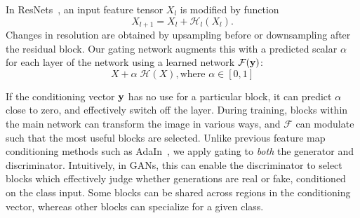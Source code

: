 
In ResNets~\cite{he2016deep}, an input feature tensor $X_l$ is modified by function
\begin{equation}
X_{l+1} = X_l+\mathcal{H}_l(X_l).
\end{equation}
Changes in resolution are obtained by upsampling before or downsampling after the residual block.
Our gating network augments this with a predicted scalar $\alpha$ for each layer of the network using a learned network $\mathcal{F}({\bf y})$:
\begin{equation}
X + \alpha \; \mathcal{H}(X), \text{where } \alpha \in [0,1]
\end{equation}

If the conditioning vector ${\bf y}$ has no use for a particular block, it can predict $\alpha$ close to zero, and effectively switch off the layer.
During training, blocks within the main network can transform the image in various ways, and $\mathcal{F}$ can modulate such that the most useful blocks are selected. 
Unlike previous feature map conditioning methods such as AdaIn~\cite{ulyanovinstance}, we apply gating to \emph{both} the generator and discriminator. 
Intuitively, in GANs, this can enable the discriminator to select blocks which effectively judge whether generations are real or fake, conditioned on the class input.
Some blocks can be shared across regions in the conditioning vector, whereas other blocks can specialize for a given class.

